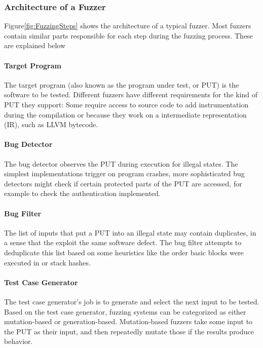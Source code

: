 \documentclass{article}
\begin{document}
\begin{multicols}{2}
    \subsubsection{Architecture of a Fuzzer}
    \label{ArchitectureFuzzer}
    Figure\ref{fig:FuzzingSteps} shows the architecture of a typical fuzzer. Most fuzzers contain similar parts responsible for each step during the fuzzing process. These are explained below

    \paragraph{Target Program}
    The target program (also known as the program under test, or PUT) is the software to be tested. Different fuzzers have different requirements for the kind of PUT they support: Some require access to source code to add instrumentation during the compilation or because they work on a intermediate representation (IR), such as LLVM bytecode.

    \paragraph{Bug Detector}
    The bug detector observes the PUT during execution for illegal states. The simplest implementations trigger on program crashes, more sophisticated bug detectors might check if certain protected parts of the PUT are accessed, for example to check the authentication implemented.

    \paragraph{Bug Filter}
    The list of inputs that put a PUT into an illegal state may contain duplicates, in a sense that the exploit the same software defect. The bug filter attempts to deduplicate this list based on some heuristics like the order basic blocks were executed in or stack hashes.

    \paragraph{Test Case Generator}
    The test case generator's job is to generate and select the next input to be tested. Based on the test case generator, fuzzing systems can be categorized as either mutation-based or generation-based. Mutation-based fuzzers take some input to the PUT as their input, and then repeatedly mutate those if the results produce  behavior\cite{EvaluatingFuzzTesting}.


\end{multicols}
\end{document}
